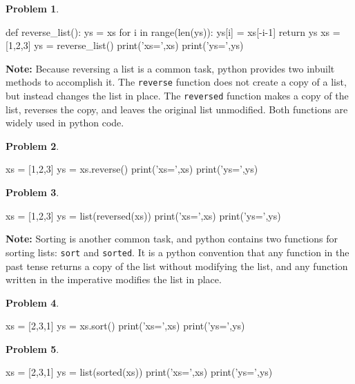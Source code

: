 \documentclass[12pt]{article}
\theoremstyle{definition}
\newtheorem{problem}{Problem}
\begin{document}
\begin{problem}
~~~
\begin{python}
def reverse_list():
    ys = xs
    for i in range(len(ys)):
        ys[i] = xs[-i-1]
    return ys
xs = [1,2,3]
ys = reverse_list()
print('xs=',xs)
print('ys=',ys)
\end{python}
\end{problem}


\newpage
\noindent
\textbf{Note:}
Because reversing a list is a common task,
python provides two inbuilt methods to accomplish it.
The \texttt{reverse} function does not create a copy of a list, but instead changes the list in place.
The \texttt{reversed} function makes a copy of the list, reverses the copy, and leaves the original list unmodified.
Both functions are widely used in python code.

\begin{problem}
~~~
\begin{python}
xs = [1,2,3]
ys = xs.reverse()
print('xs=',xs)
print('ys=',ys)
\end{python}
\end{problem}
\vspace{2in}

\begin{problem}
~~~
\begin{python}
xs = [1,2,3]
ys = list(reversed(xs))
print('xs=',xs)
print('ys=',ys)
\end{python}
\end{problem}

\newpage
\noindent
\textbf{Note:}
Sorting is another common task, and python contains two functions for sorting lists: \texttt{sort} and \texttt{sorted}.
It is a python convention that any function in the past tense returns a copy of the list without modifying the list, 
and any function written in the imperative modifies the list in place.

\begin{problem}
~~~
\begin{python}
xs = [2,3,1]
ys = xs.sort()
print('xs=',xs)
print('ys=',ys)
\end{python}
\end{problem}
\vspace{2in}

\begin{problem}
~~~
\begin{python}
xs = [2,3,1]
ys = list(sorted(xs))
print('xs=',xs)
print('ys=',ys)
\end{python}
\end{problem}
\end{document}
